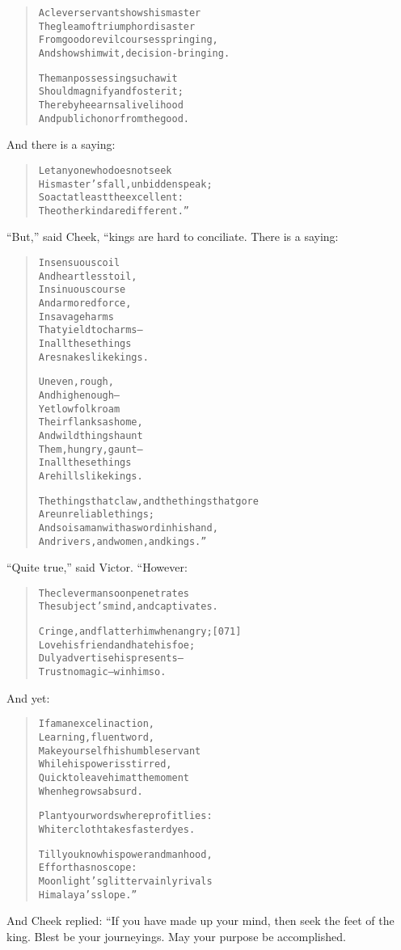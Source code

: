 \documentclass[article, twoside, 14pt]{memoir}
\renewenvironment{verbatim}{%
\begin{quote}%
\vskip -10pt%
\begin{alltt}\normalfont\large}{\end{alltt}%
\end{quote}%
\vskip -10pt
} %
\begin{document}
\begin{verbatim}
A clever servant shows his master
The gleam of triumph or disaster
From good or evil courses springing,
And shows him wit, decision-bringing.

The man possessing such a wit
Should magnify and foster it;
Thereby he earns a livelihood
And public honor from the good.
\end{verbatim}
And there is a saying:

\begin{verbatim}
Let anyone who does not seek
His master's fall, unbidden speak;
So act at least the excellent:
The other kind are different.”
\end{verbatim}
``But,'' said Cheek, “kings are hard to conciliate. There is a
saying:

\begin{verbatim}
In sensuous coil
And heartless toil,
In sinuous course
And armored force,
In savage harms
That yield to charms--
In all these things
Are snakes like kings.

Uneven, rough,
And high enough--
Yet low folk roam
Their flanks as home,
And wild things haunt
Them, hungry, gaunt--
In all these things
Are hills like kings.

The things that claw, and the things that gore
    Are unreliable things;
And so is a man with a sword in his hand,
    And rivers, and women, and kings.”
\end{verbatim}
``Quite true,'' said Victor. “However:

\begin{verbatim}
The clever man soon penetrates
The subject's mind, and captivates.

Cringe, and flatter him when angry;                     [071]
    Love his friend and hate his foe;
Duly advertise his presents--
    Trust no magic--win him so.
\end{verbatim}
And yet:

\begin{verbatim}
If a man excel in action,
    Learning, fluent word,
Make yourself his humble servant
    While his power is stirred,
Quick to leave him at the moment
    When he grows absurd.

Plant your words where profit lies:
Whiter cloth takes faster dyes.

Till you know his power and manhood,
    Effort has no scope:
Moonlight's glitter vainly rivals
    Himalaya's slope.”
\end{verbatim}
And Cheek replied: “If you have made up your mind, then seek the
feet of the king. Blest be your journeyings. May your purpose be
accomplished.
\end{document}
